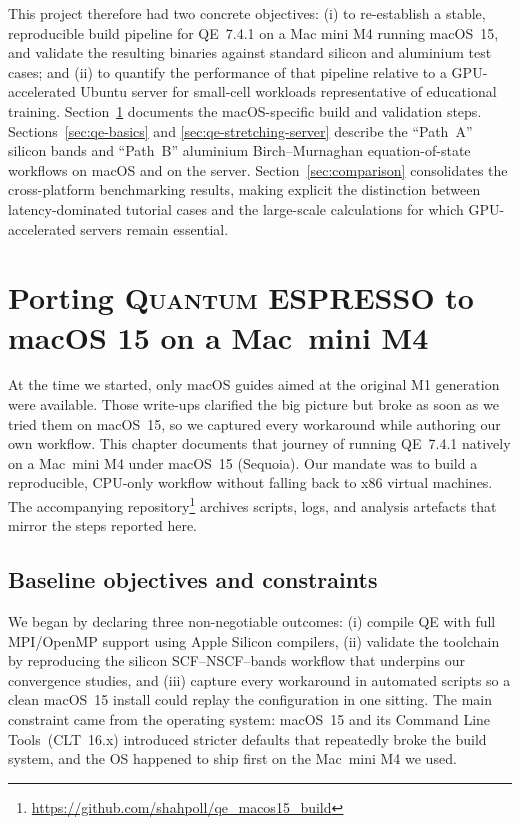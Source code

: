 \documentclass[12pt]{article}
\begin{document}
This project therefore had two concrete objectives: (i) to re-establish a stable, reproducible build pipeline for QE~7.4.1 on a Mac mini M4 running macOS~15, and validate the resulting binaries against standard silicon and aluminium test cases; and (ii) to quantify the performance of that pipeline relative to a GPU-accelerated Ubuntu server for small-cell workloads representative of educational training. Section~\ref{sec:m4section} documents the macOS-specific build and validation steps. Sections~\ref{sec:qe-basics} and \ref{sec:qe-stretching-server} describe the ``Path~A'' silicon bands and ``Path~B'' aluminium Birch--Murnaghan equation-of-state workflows on macOS and on the server. Section~\ref{sec:comparison} consolidates the cross-platform benchmarking results, making explicit the distinction between latency-dominated tutorial cases and the large-scale calculations for which GPU-accelerated servers remain essential.

\section{Porting \textsc{Quantum ESPRESSO} to macOS 15 on a Mac~mini M4}
\label{sec:m4section}
At the time we started, only macOS guides aimed at the original M1 generation were available. Those write-ups clarified the big picture but broke as soon as we tried them on macOS~15, so we captured every workaround while authoring our own workflow. This chapter documents that journey of running QE~7.4.1 natively on a Mac~mini M4 under macOS~15 (Sequoia). Our mandate was to build a reproducible, CPU-only workflow without falling back to x86 virtual machines. The accompanying repository\footnote{\url{https://github.com/shahpoll/qe_macos15_build}} archives scripts, logs, and analysis artefacts that mirror the steps reported here.

\subsection{Baseline objectives and constraints}
We began by declaring three non-negotiable outcomes: (i) compile QE with full MPI/OpenMP support using Apple Silicon compilers, (ii) validate the toolchain by reproducing the silicon SCF--NSCF--bands workflow that underpins our convergence studies, and (iii) capture every workaround in automated scripts so a clean macOS~15 install could replay the configuration in one sitting. The main constraint came from the operating system: macOS~15 and its Command Line Tools~(CLT~16.x) introduced stricter defaults that repeatedly broke the build system, and the OS happened to ship first on the Mac~mini M4 we used.
\end{document}
